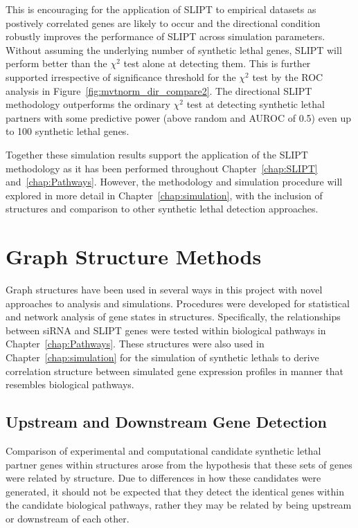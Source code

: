This is encouraging for the application of \gls{SLIPT} to empirical  datasets as postively correlated genes are likely to occur and the directional condition robustly improves the performance of \gls{SLIPT} across simulation parameters. Without assuming the underlying number of \gls{synthetic lethal} genes, \gls{SLIPT} will perform better than the $\chi^2$ test alone at detecting them. This is further supported irrespective of significance threshold for the $\chi^2$ test by the \gls{ROC} analysis in Figure~\ref{fig:mvtnorm_dir_compare2}. The directional \gls{SLIPT} methodology outperforms the ordinary $\chi^2$ test at detecting \gls{synthetic lethal} partners with some predictive power (above random and \gls{AUROC} of 0.5) even up to 100 \gls{synthetic lethal} genes.

Together these simulation results support the application of the \gls{SLIPT} methodology as it has been performed throughout Chapter~\ref{chap:SLIPT} and~\ref{chap:Pathways}. However, the methodology and simulation procedure will explored in more detail in Chapter~\ref{chap:simulation}, with the inclusion of  structures and comparison to other \gls{synthetic lethal} detection approaches.

\FloatBarrier

\section{Graph Structure Methods}
Graph structures have been used in several ways in this project with novel approaches to analysis and simulations. Procedures were developed for statistical and network analysis of gene states in  structures. Specifically, the relationships between \gls{siRNA} and \gls{SLIPT} genes were tested within biological pathways in Chapter~\ref{chap:Pathways}. These  structures were also used in Chapter~\ref{chap:simulation} for the simulation of \glspl{synthetic lethal} to derive correlation structure between simulated \gls{gene expression} profiles in manner that resembles biological pathways.


\subsection{Upstream and Downstream Gene Detection} \label{methods:pathway_str} 
Comparison of experimental and computational candidate \gls{synthetic lethal} partner genes within  structures arose from the hypothesis that these sets of genes were related by  structure. Due to differences in how these candidates were generated, it should not be expected that they detect the identical genes within the candidate biological pathways, rather they may be related by being upstream or downstream of each other. 


